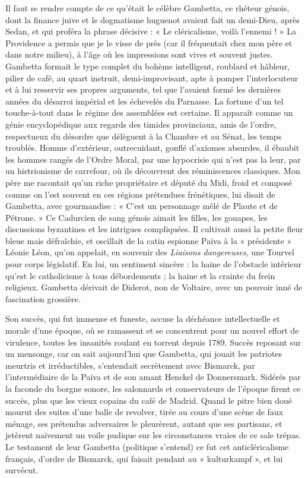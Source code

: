 \documentclass[french,twoside]{book} %
\begin{document}
Il faut se rendre compte de ce qu’était le célèbre Gambetta, ce rhéteur génois, dont la finance juive et le dogmatisme huguenot avaient fait un demi-Dieu, après Sedan, et qui proféra la phrase décisive : « Le cléricalisme, voilà l’ennemi ! » La Providence a permis que je le visse de près (car il fréquentait chez mon père et dans notre milieu), à l’âge où les impressions sont vives et souvent justes. Gambetta formait le type complet du bohème intelligent, roublard et hâbleur, pilier de café, au quart instruit, demi-improvisant, apte à pomper l’interlocuteur et à lui resservir ses propres arguments, tel que l’avaient formé les dernières années du désarroi impérial et les échevelés du Parnasse. La fortune d’un tel touche-à-tout dans le régime des assemblées est certaine. Il apparaît comme un génie encyclopédique aux regards des timides provinciaux, amis de l’ordre, respectueux du désordre que délèguent à la Chambre et au Sénat, les temps troublés. Homme d’extérieur, outrecuidant, gonflé d’axiomes absurdes, il ébaubit les hommes rangés de l’Ordre Moral, par une hypocrisie qui n’est pas la leur, par un histrionisme de carrefour, où ils découvrent des réminiscences classiques. Mon père me racontait qu’un riche propriétaire et député du Midi, froid et composé comme on l’est souvent en ces régions prétendues frénétiques, lui disait de Gambetta, avec gourmandise : « C’est un personnage mêlé de Plaute et de Pétrone. » Ce Cadurcien de sang génois aimait les filles, les gouapes, les discussions byzantines et les intrigues compliquées. Il cultivait aussi la petite fleur bleue mais défraîchie, et oscillait de la catin espionne Païva à la « présidente » Léonie Léon, qu’on appelait, en souvenir des {\itshape Liaisons dangereuses}, une Tourvel pour corps législatif. En lui, un sentiment sincère : la haine de l’obstacle intérieur qu’est le catholicisme à tous débordements ; la haine et la crainte du frein religieux. Gambetta dérivait de Diderot, non de Voltaire, avec un pouvoir inné de fascination grossière.\par
Son succès, qui fut immense et funeste, accuse la déchéance intellectuelle et morale d’une époque, où se ramassent et se concentrent pour un nouvel effort de virulence, toutes les insanités roulant en torrent depuis 1789. Succès reposant sur un mensonge, car on sait aujourd’hui que Gambetta, qui jouait les patriotes meurtris et irréductibles, s’entendait secrètement avec Bismarck, par l’intermédiaire de la Païva et de son amant Henckel de Donnersmark. Sidérés par la faconde du borgne sonore, les salonnards et conservateurs de l’époque firent ce succès, plus que les vieux copains du café de Madrid. Quand le pitre bien doué mourut des suites d’une balle de revolver, tirée au cours d’une scène de faux ménage, ses prétendus adversaires le pleurèrent, autant que ses partisans, et jetèrent naïvement un voile pudique sur les circonstances vraies de ce sale trépas. Le testament de leur Gambetta (politique s’entend) ce fut cet anticléricalisme français, d’ordre de Bismarck, qui faisait pendant au « kulturkampf », et lui survécut.\par
\end{document}
